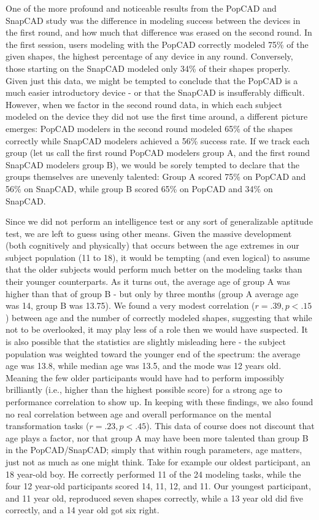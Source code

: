 One of the more profound and noticeable results from the PopCAD and SnapCAD
study was the difference in modeling success between the devices in the first
round, and how much that difference was erased on the second round. In the first
session, users modeling with the PopCAD correctly modeled 75\% of the given
shapes, the highest percentage of any device in any round. Conversely, those
starting on the SnapCAD modeled only 34\% of their shapes properly. Given just
this data, we might be tempted to conclude that the PopCAD is a much easier
introductory device - or that the SnapCAD is insufferably difficult. However,
when we factor in the second round data, in which each subject modeled on the
device they did not use the first time around, a different picture emerges:
PopCAD modelers in the second round modeled 65\% of the shapes correctly while
SnapCAD modelers achieved a 56\% success rate. If we track each group (let us
call the first round PopCAD modelers group A, and the first round SnapCAD
modelers group B), we would be sorely tempted to declare that the groups
themselves are unevenly talented: Group A scored 75\% on PopCAD and 56\% on
SnapCAD, while group B scored 65\% on PopCAD and 34\% on SnapCAD. 

Since we did not perform an intelligence test or any sort of generalizable
aptitude test, we are left to guess using other means. Given the massive
development (both cognitively and physically) that occurs between the age
extremes in our subject population (11 to 18), it would be tempting (and even
logical) to assume that the older subjects would perform much better on the
modeling tasks than their younger counterparts. As it turns out, the average age
of group A was higher than that of group B - but only by three months (group A
average age was 14, group B was 13.75). We found a very modest correlation ($r =
.39, p < .15$) between age and the number of correctly modeled shapes,
suggesting that while not to be overlooked, it may play less of a role then we
would have suspected. It is also possible that the statistics are slightly
misleading here - the subject population was weighted toward the younger end of
the spectrum: the average age was 13.8, while median age was 13.5, and the mode
was 12 years old. Meaning the few older participants would have had to perform
impossibly brilliantly (i.e., higher than the highest possible score) for a
strong age to performance correlation to show up. In keeping with these
findings, we also found no real correlation between age and overall performance
on the mental transformation tasks ($r = .23, p < .45$). This data of course
does not discount that age plays a factor, nor that group A may have been more
talented than group B in the PopCAD/SnapCAD; simply that within rough
parameters, age matters, just not as much as one might think. Take for example
our oldest participant, an 18 year-old boy. He correctly performed 11 of the 24
modeling tasks, while the four 12 year-old participants scored 14, 11, 12, and
11. Our youngest participant, and 11 year old, reproduced seven shapes
correctly, while a 13 year old did five correctly, and a 14 year old got six
right.


